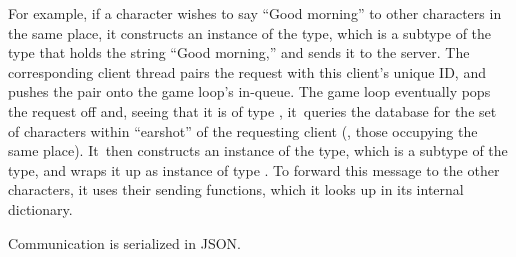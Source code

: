 For example, if a character wishes to say ``Good morning'' to other characters
in the same place, it constructs an instance of the  type, which is a
subtype of the  type that holds the string ``Good morning,'' and
sends it to the server.
The corresponding client thread pairs the request with this client's unique
ID, and pushes the pair onto the game loop's in-queue.
The game loop eventually pops the request off and, seeing that it is
of type , it~queries the database
for the set of characters within ``earshot'' of the requesting client (\ie,
those occupying the same place).
It~then constructs an instance of the
 type, which is a subtype of the  type, and wraps it up
as instance of type .
To forward this message to the other characters, it uses their sending
functions, which it looks up in its internal dictionary.

Communication is serialized in JSON\@.